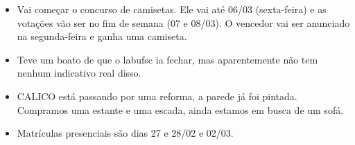 \documentclass{ata-calico}
\begin{document}
\maketitle

\begin{itemize}
\item Vai começar o concurso de camisetas. Ele vai até 06/03 (sexta-feira) e as votações vão ser no fim de semana (07 e 08/03). O vencedor vai ser anunciado na segunda-feira e ganha uma camiseta.
\item Teve um boato de que o labufsc ia fechar, mas aparentemente não tem nenhum indicativo real disso.
\item CALICO está passando por uma reforma, a parede já foi pintada. Compramos uma estante e uma escada, ainda estamos em busca de um sofá.
\item Matrículas presenciais são dias 27 e 28/02 e 02/03.
\end{itemize}
\end{document}
